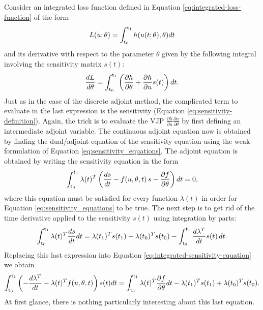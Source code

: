 Consider an integrated loss function defined in Equation \eqref{eq:integrated-loss-function} of the form 
\begin{equation}
    L(u; \theta) = \operatorname{\int_{t_0}^{t_1}} h(u(t;\theta), \theta) dt
\end{equation}
and its derivative with respect to the parameter $\theta$ given by the following integral involving the sensitivity matrix $s(t)$:
\begin{equation}
    \frac{dL}{d\theta}
    = 
    \operatorname{\int_{t_0}^{t_1}} \left( \frac{\partial h}{\partial \theta} + \frac{\partial h}{\partial u} s(t) \right) dt.
    \label{eq:casa-loss}
\end{equation}
Just as in the case of the discrete adjoint method, the complicated term to evaluate in the last expression is the sensitivity (Equation \eqref{eq:sensitivity-definition}).
Again, the trick is to evaluate the VJP $\frac{\partial h}{\partial u} \frac{\partial u}{\partial \theta}$ by first defining an intermediate adjoint variable. 
The continuous adjoint equation now is obtained by finding the dual/adjoint equation of the sensitivity equation using the weak formulation of Equation \eqref{eq:sensitivity_equations}. 
The adjoint equation is obtained by writing the sensitivity equation in the form 
\begin{equation}
    \operatorname{\int_{t_0}^{t_1}} \lambda(t)^T \left( \frac{ds}{dt} - f(u, \theta, t) \, s - \frac{\partial f}{\partial \theta}  \right) dt 
    = 
    0,
    \label{eq:integrated-sensitivity-equation}
\end{equation}
where this equation must be satisfied for every function $\lambda(t)$ in order for Equation \eqref{eq:sensitivity_equations} to be true. 
The next step is to get rid of the time derivative applied to the sensitivity $s(t)$ using integration by parts: 
\begin{equation}
    \operatorname{\int_{t_0}^{t_1}} \lambda(t)^T \frac{ds}{dt} dt
    = 
    \lambda(t_1)^T s(t_1) - \lambda(t_0)^T s(t_0)
    -
    \operatorname{\int_{t_0}^{t_1}} \frac{d\lambda^T}{dt} s(t)\, dt.
\end{equation}
Replacing this last expression into Equation \eqref{eq:integrated-sensitivity-equation} we obtain 
\begin{equation}
    \operatorname{\int_{t_0}^{t_1}} \left( - \frac{d\lambda^T}{dt} -  \lambda(t)^T f(u, \theta, t) \right) s(t) dt
    =
    \operatorname{\int_{t_0}^{t_1}} \lambda(t)^T \frac{\partial f}{\partial \theta} dt 
    - 
    \lambda(t_1)^T s(t_1)
    + 
    \lambda(t_0)^T s(t_0).
    \label{eq:casa-semiadjoint}
\end{equation}
At first glance, there is nothing particularly interesting about this last equation. 
